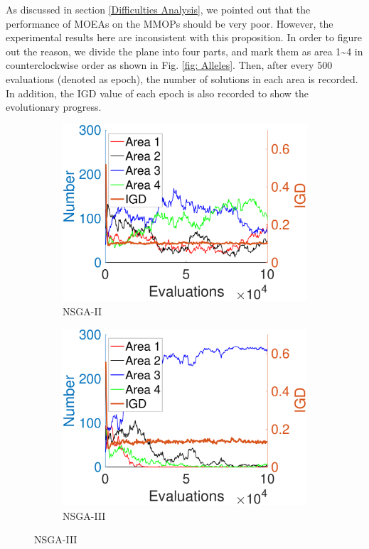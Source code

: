 \documentclass[conference]{IEEEtran}
\begin{document}
As discussed in section \ref{Difficulties Analysis}, we pointed out that the performance of MOEAs on the MMOPs should be very poor. However, the experimental results here are inconsistent with this proposition. In order to figure out the reason, we divide the plane into four parts, and mark them as area 1\textasciitilde 4 in counterclockwise order as shown in Fig. \ref{fig: Alleles}. Then, after every 500 evaluations (denoted as epoch), the number of solutions in each area is recorded. In addition, the IGD value of each epoch is also recorded to show the evolutionary progress. 

\begin{figure}[htbp]
    \centering
    \begin{subfigure}[b]{.24\textwidth}
    \includegraphics[width=\linewidth]{Section5/dim2/Diversity/NSGAII}
    \caption{NSGA-II}
    \end{subfigure}
    \begin{subfigure}[b]{.24\textwidth}
    \includegraphics[width=\linewidth]{Section5/dim2/Diversity/NSGAIII}
    \caption{NSGA-III}
    \label{fig: NSGA-III Diversity dim=2}
    

\end{subfigure}
\end{figure}
\end{document}
